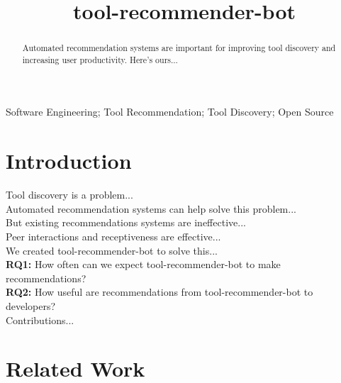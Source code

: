 \documentclass[conference]{IEEEtran}
\newcommand{\tool}{tool-recommender-bot }
\begin{document}

\title{\tool}

\author{
}

\maketitle
\begin{abstract}
Automated recommendation systems are important for improving tool discovery and increasing user productivity. Here's ours...
\end{abstract}

\begin{IEEEkeywords}
Software Engineering; Tool Recommendation; Tool Discovery; Open Source
\end{IEEEkeywords}

\section{Introduction}
Tool discovery is a problem... \\

Automated recommendation systems can help solve this problem... \\

But existing recommendations systems are ineffective... \\

Peer interactions and receptiveness are effective\cite{vlhcc17}... \\

We created \tool to solve this... \\

\noindent
\textbf{RQ1:} How often can we expect \tool to make recommendations?  \\
\textbf{RQ2:} How useful are recommendations from \tool to developers?  \\

Contributions...\\

\section{Related Work}
\end{document}
